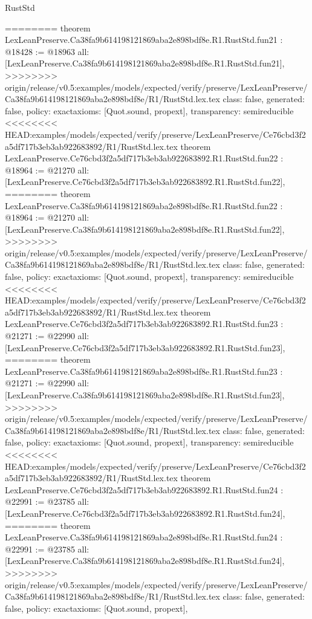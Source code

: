 \begin{lexlean}{RustStd}
\begin{coremodule}
{\begin{coremodule}
{{{{{{{{{{{{{{{{{{{{{{{{========
theorem LexLeanPreserve.Ca38fa9b614198121869aba2e898bdf8e.R1.RustStd.fun21 : @18428 := @18963 {
  all: [LexLeanPreserve.Ca38fa9b614198121869aba2e898bdf8e.R1.RustStd.fun21],
>>>>>>>> origin/release/v0.5:examples/models/expected/verify/preserve/LexLeanPreserve/Ca38fa9b614198121869aba2e898bdf8e/R1/RustStd.lex.tex
  class: false,
  generated: false,
  policy: exact{axioms: [Quot.sound, propext]},
  transparency: semireducible
}
<<<<<<<< HEAD:examples/models/expected/verify/preserve/LexLeanPreserve/Ce76cbd3f2a5df717b3eb3ab922683892/R1/RustStd.lex.tex
theorem LexLeanPreserve.Ce76cbd3f2a5df717b3eb3ab922683892.R1.RustStd.fun22 : @18964 := @21270 {
  all: [LexLeanPreserve.Ce76cbd3f2a5df717b3eb3ab922683892.R1.RustStd.fun22],
========
theorem LexLeanPreserve.Ca38fa9b614198121869aba2e898bdf8e.R1.RustStd.fun22 : @18964 := @21270 {
  all: [LexLeanPreserve.Ca38fa9b614198121869aba2e898bdf8e.R1.RustStd.fun22],
>>>>>>>> origin/release/v0.5:examples/models/expected/verify/preserve/LexLeanPreserve/Ca38fa9b614198121869aba2e898bdf8e/R1/RustStd.lex.tex
  class: false,
  generated: false,
  policy: exact{axioms: [Quot.sound, propext]},
  transparency: semireducible
}
<<<<<<<< HEAD:examples/models/expected/verify/preserve/LexLeanPreserve/Ce76cbd3f2a5df717b3eb3ab922683892/R1/RustStd.lex.tex
theorem LexLeanPreserve.Ce76cbd3f2a5df717b3eb3ab922683892.R1.RustStd.fun23 : @21271 := @22990 {
  all: [LexLeanPreserve.Ce76cbd3f2a5df717b3eb3ab922683892.R1.RustStd.fun23],
========
theorem LexLeanPreserve.Ca38fa9b614198121869aba2e898bdf8e.R1.RustStd.fun23 : @21271 := @22990 {
  all: [LexLeanPreserve.Ca38fa9b614198121869aba2e898bdf8e.R1.RustStd.fun23],
>>>>>>>> origin/release/v0.5:examples/models/expected/verify/preserve/LexLeanPreserve/Ca38fa9b614198121869aba2e898bdf8e/R1/RustStd.lex.tex
  class: false,
  generated: false,
  policy: exact{axioms: [Quot.sound, propext]},
  transparency: semireducible
}
<<<<<<<< HEAD:examples/models/expected/verify/preserve/LexLeanPreserve/Ce76cbd3f2a5df717b3eb3ab922683892/R1/RustStd.lex.tex
theorem LexLeanPreserve.Ce76cbd3f2a5df717b3eb3ab922683892.R1.RustStd.fun24 : @22991 := @23785 {
  all: [LexLeanPreserve.Ce76cbd3f2a5df717b3eb3ab922683892.R1.RustStd.fun24],
========
theorem LexLeanPreserve.Ca38fa9b614198121869aba2e898bdf8e.R1.RustStd.fun24 : @22991 := @23785 {
  all: [LexLeanPreserve.Ca38fa9b614198121869aba2e898bdf8e.R1.RustStd.fun24],
>>>>>>>> origin/release/v0.5:examples/models/expected/verify/preserve/LexLeanPreserve/Ca38fa9b614198121869aba2e898bdf8e/R1/RustStd.lex.tex
  class: false,
  generated: false,
  policy: exact{axioms: [Quot.sound, propext]},
}}}}}}}}}}}}}}}}}}}}}}}}}}}}
\end{coremodule}}
\end{coremodule}
\end{lexlean}
